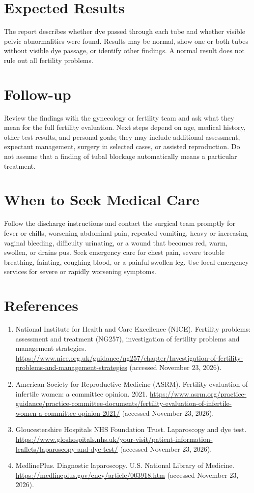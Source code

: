 \section*{Expected Results}
The report describes whether dye passed through each tube and whether visible pelvic abnormalities were found. Results may be normal, show one or both tubes without visible dye passage, or identify other findings. A normal result does not rule out all fertility problems.

\section*{Follow-up}
Review the findings with the gynecology or fertility team and ask what they mean for the full fertility evaluation. Next steps depend on age, medical history, other test results, and personal goals; they may include additional assessment, expectant management, surgery in selected cases, or assisted reproduction. Do not assume that a finding of tubal blockage automatically means a particular treatment.

\section*{When to Seek Medical Care}
Follow the discharge instructions and contact the surgical team promptly for fever or chills, worsening abdominal pain, repeated vomiting, heavy or increasing vaginal bleeding, difficulty urinating, or a wound that becomes red, warm, swollen, or drains pus. Seek emergency care for chest pain, severe trouble breathing, fainting, coughing blood, or a painful swollen leg. Use local emergency services for severe or rapidly worsening symptoms.

\section*{References}
\begin{enumerate}
  \item National Institute for Health and Care Excellence (NICE). Fertility problems: assessment and treatment (NG257), investigation of fertility problems and management strategies. \url{https://www.nice.org.uk/guidance/ng257/chapter/Investigation-of-fertility-problems-and-management-strategies} (accessed November 23, 2026).
  \item American Society for Reproductive Medicine (ASRM). Fertility evaluation of infertile women: a committee opinion. 2021. \url{https://www.asrm.org/practice-guidance/practice-committee-documents/fertility-evaluation-of-infertile-women-a-committee-opinion-2021/} (accessed November 23, 2026).
  \item Gloucestershire Hospitals NHS Foundation Trust. Laparoscopy and dye test. \url{https://www.gloshospitals.nhs.uk/your-visit/patient-information-leaflets/laparoscopy-and-dye-test/} (accessed November 23, 2026).
  \item MedlinePlus. Diagnostic laparoscopy. U.S. National Library of Medicine. \url{https://medlineplus.gov/ency/article/003918.htm} (accessed November 23, 2026).
\end{enumerate}

\clearpage
